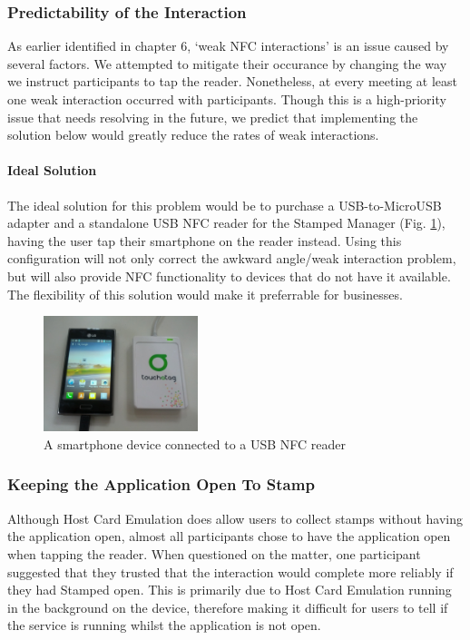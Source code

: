 \subsubsection{Predictability of the Interaction}
As earlier identified in chapter 6, `weak NFC interactions' is an issue caused by several factors. We attempted to mitigate their occurance by changing the way we instruct participants to tap the reader. Nonetheless, at every meeting at least one weak interaction occurred with participants. Though this is a high-priority issue that needs resolving in the future, we predict that implementing the solution below would greatly reduce the rates of weak interactions.

\paragraph{Ideal Solution}

The ideal solution for this problem would be to purchase a USB-to-MicroUSB adapter and a standalone USB NFC reader for the Stamped Manager (Fig. \ref{fig:usbnfc}), having the user tap their smartphone on the reader instead. Using this configuration will not only correct the awkward angle/weak interaction problem, but will also provide NFC functionality to devices that do not have it available.  The flexibility of this solution would make it preferrable for businesses.

\begin{figure}[H]
 \centering
  \includegraphics[width=0.4\textwidth]{img/nfcusb.jpg}
     \caption{A smartphone device connected to a USB NFC reader}
     \label{fig:usbnfc}
\end{figure}

\subsubsection{Keeping the Application Open To Stamp}
Although Host Card Emulation does allow users to collect stamps without having the application open, almost all participants chose to have the application open when tapping the reader. When questioned on the matter, one participant suggested that they trusted that the interaction would complete more reliably if they had Stamped open. This is primarily due to Host Card Emulation running in the background on the device, therefore making it difficult for users to tell if the service is running whilst the application is not open.

